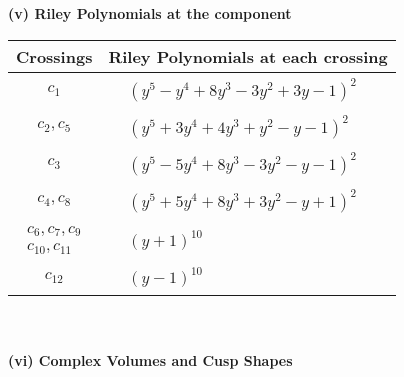 \documentclass[1p]{elsarticle_modified}
\theoremstyle{definition}
\begin{document}
\newpage\renewcommand{\arraystretch}{1}
\flushleft \textbf{(v) Riley Polynomials at the component}\newline \\
\begin{tabular}{m{50pt}|m{274pt}}
Crossings & \hspace{64pt}Riley Polynomials at each crossing \\
\hline $$\begin{aligned}c_{1}\end{aligned}$$&$\begin{aligned}
&(y^5- y^4+8 y^3-3 y^2+3 y-1)^2
\end{aligned}$\\
\hline $$\begin{aligned}c_{2},c_{5}\end{aligned}$$&$\begin{aligned}
&(y^5+3 y^4+4 y^3+y^2- y-1)^2
\end{aligned}$\\
\hline $$\begin{aligned}c_{3}\end{aligned}$$&$\begin{aligned}
&(y^5-5 y^4+8 y^3-3 y^2- y-1)^2
\end{aligned}$\\
\hline $$\begin{aligned}c_{4},c_{8}\end{aligned}$$&$\begin{aligned}
&(y^5+5 y^4+8 y^3+3 y^2- y+1)^2
\end{aligned}$\\
\hline $$\begin{aligned}c_{6},c_{7},c_{9}\\c_{10},c_{11}\end{aligned}$$&$\begin{aligned}
&(y+1)^{10}
\end{aligned}$\\
\hline $$\begin{aligned}c_{12}\end{aligned}$$&$\begin{aligned}
&(y-1)^{10}
\end{aligned}$\\
\hline
\end{tabular}\\~\\
\newpage\flushleft \textbf{(vi) Complex Volumes and Cusp Shapes}
\end{document}
